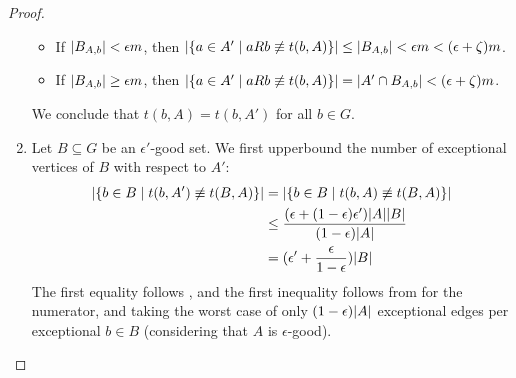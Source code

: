 \begin{lemma}[Claim 5.13]
\begin{proof}
\begin{enumerate}[label=(\alph*), ref=\alph*]
\begin{itemize}
                        \item If $| B_{A,b} | < \epsilon m$, then
                            $| \{ a \in A' \mid a R b \not \equiv t(b,A) \} | \leq | B_{A,b} |
                            < \epsilon m < ( \epsilon + \zeta ) m$.
                        \item If $| B_{A,b} | \geq \epsilon m$, then
                            $| \{ a \in A' \mid a R b \not \equiv t(b,A) \} | = | A' \cap B_{A,b} |
                            < ( \epsilon + \zeta ) m$.
                    \end{itemize}
                We conclude that $t(b,A) = t(b,A')$ for all $b \in G$.
                \item Let $B \subseteq G$ be an $\epsilon'$-good set.
                    We first upperbound the number of exceptional vertices of $B$ with respect to $A'$:
                    \begin{align*}
                        | \{ b \in B \mid t(b, A') \not\equiv t(B,A) \} |
                            & = | \{ b \in B \mid t(b, A) \not\equiv t(B,A) \} | \\
                            & \leq \frac{( \epsilon + ( 1 - \epsilon ) \epsilon' )| A || B |}
                                {( 1 - \epsilon )| A |} \\
                            & = ( \epsilon' + \frac{\epsilon}{1 - \epsilon} )| B |
                    \end{align*}
                    The first equality follows , and the first inequality follows from
                     for the numerator, and taking the worst case of only
                    $(1 - \epsilon) | A |$ exceptional edges per exceptional $b \in B$
                    (considering that $A$ is $\epsilon$-good).


\end{enumerate}
\end{proof}
\end{lemma}
